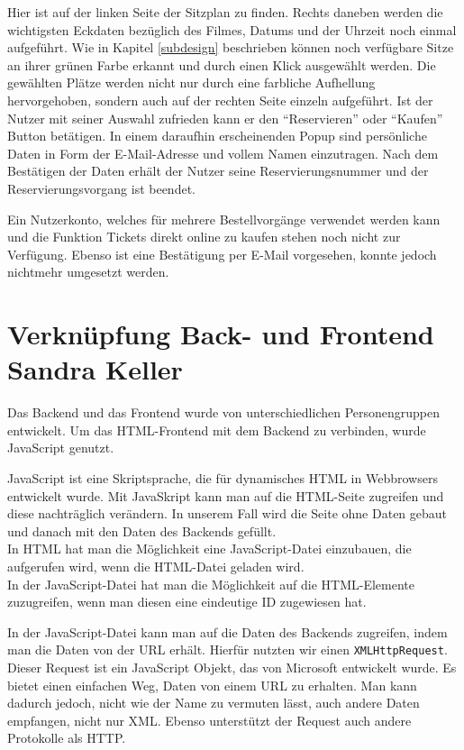 	Hier ist auf der linken Seite der Sitzplan zu finden. Rechts daneben werden die wichtigsten Eckdaten bezüglich des Filmes, Datums und der Uhrzeit noch einmal aufgeführt. Wie in Kapitel \vref{subdesign} beschrieben können noch verfügbare Sitze an ihrer grünen Farbe erkannt und durch einen Klick ausgewählt werden. Die gewählten Plätze werden nicht nur durch eine farbliche Aufhellung hervorgehoben, sondern auch auf der rechten Seite einzeln aufgeführt. Ist der Nutzer mit seiner Auswahl zufrieden kann er den \enquote{Reservieren} oder \enquote{Kaufen} Button betätigen. In einem daraufhin erscheinenden Popup sind persönliche Daten in Form der E-Mail-Adresse und vollem Namen einzutragen. Nach dem Bestätigen der Daten erhält der Nutzer seine Reservierungsnummer und der Reservierungsvorgang ist beendet.
	
	Ein Nutzerkonto, welches für mehrere Bestellvorgänge verwendet werden kann und die Funktion Tickets direkt online zu kaufen stehen noch nicht zur Verfügung. Ebenso ist eine Bestätigung per E-Mail vorgesehen, konnte jedoch nichtmehr umgesetzt werden. 
	
	
	\section[Verknüpfung Back- und Frontend]{Verknüpfung Back- und Frontend {\hfill \normalsize Sandra Keller}}
	Das Backend und das Frontend wurde von unterschiedlichen Personengruppen entwickelt. Um das \ac{HTML}-Frontend mit dem Backend zu verbinden, wurde JavaScript genutzt. 
	
	JavaScript ist eine Skriptsprache, die für dynamisches \ac{HTML} in Webbrowsers entwickelt wurde. Mit JavaSkript kann man auf die \ac{HTML}-Seite zugreifen und diese nachträglich verändern. In unserem Fall wird die Seite ohne Daten gebaut und danach mit den Daten des Backends gefüllt.
	\\In \ac{HTML} hat man die Möglichkeit eine JavaScript-Datei einzubauen, die aufgerufen wird, wenn die HTML-Datei geladen wird. 
	\\In der JavaScript-Datei hat man die Möglichkeit auf die \ac{HTML}-Elemente zuzugreifen, wenn man diesen eine eindeutige \ac{ID} zugewiesen hat. 

	
	In der JavaScript-Datei kann man auf die Daten des Backends zugreifen, indem man die Daten von der \ac{URL} erhält. Hierfür nutzten wir einen \texttt{XMLHttpRequest}. Dieser Request ist ein JavaScript Objekt, das von Microsoft entwickelt wurde. Es bietet einen einfachen Weg, Daten von einem \ac{URL} zu erhalten. Man kann dadurch jedoch, nicht wie der Name zu vermuten lässt, auch andere Daten empfangen, nicht nur XML. Ebenso unterstützt der Request auch andere Protokolle als \ac{HTTP}.
	
